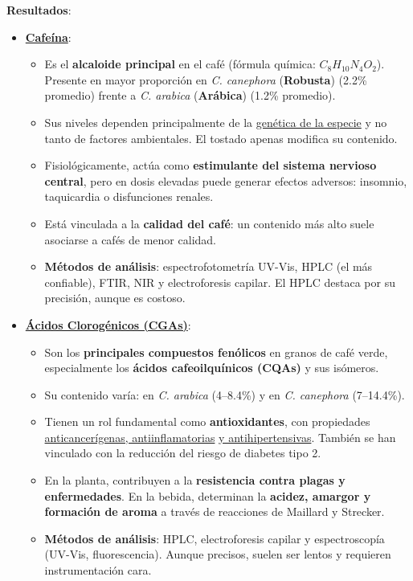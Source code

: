 \documentclass{article}
\begin{document}
\textbf{Resultados}:  
\begin{itemize}
	\item \underline{\textbf{Cafeína}}:
	\begin{itemize}
		\item Es el \textbf{alcaloide principal} en el café (fórmula química: $C_{8}H_{10}N_{4}O_{2}$). Presente en mayor proporción en \textit{C. canephora} (\textbf{Robusta}) (2.2\% promedio) frente a \textit{C. arabica} (\textbf{Arábica}) (1.2\% promedio).  
		\item Sus niveles dependen principalmente de la \underline{genética de la especie} y no tanto de factores ambientales. El tostado apenas modifica su contenido.  
		\item Fisiológicamente, actúa como \textbf{estimulante del sistema nervioso central}, pero en dosis elevadas puede generar efectos adversos: insomnio, taquicardia o disfunciones renales.  
		\item Está vinculada a la \textbf{calidad del café}: un contenido más alto suele asociarse a cafés de menor calidad.  
		\item \textbf{Métodos de análisis}: espectrofotometría UV-Vis, HPLC (el más confiable), FTIR, NIR y electroforesis capilar. El HPLC destaca por su precisión, aunque es costoso.  
	\end{itemize}
	
	\item \underline{\textbf{Ácidos Clorogénicos (CGAs)}}:
	\begin{itemize}
		\item Son los \textbf{principales compuestos fenólicos} en granos de café verde, especialmente los \textbf{ácidos cafeoilquínicos (CQAs)} y sus isómeros.  
		\item Su contenido varía: en \textit{C. arabica} (4–8.4\%) y en \textit{C. canephora} (7–14.4\%).  
		\item Tienen un rol fundamental como \textbf{antioxidantes}, con propiedades \underline{anticancerígenas, antiinflamatorias} \underline{y antihipertensivas}. También se han vinculado con la reducción del riesgo de diabetes tipo 2.  
		\item En la planta, contribuyen a la \textbf{resistencia contra plagas y enfermedades}. En la bebida, determinan la \textbf{acidez, amargor y formación de aroma} a través de reacciones de Maillard y Strecker.  
		\item \textbf{Métodos de análisis}: HPLC, electroforesis capilar y espectroscopía (UV-Vis, fluorescencia). Aunque precisos, suelen ser lentos y requieren instrumentación cara.  
	\end{itemize}
\end{itemize} \vspace{0.5cm}
\end{document}
